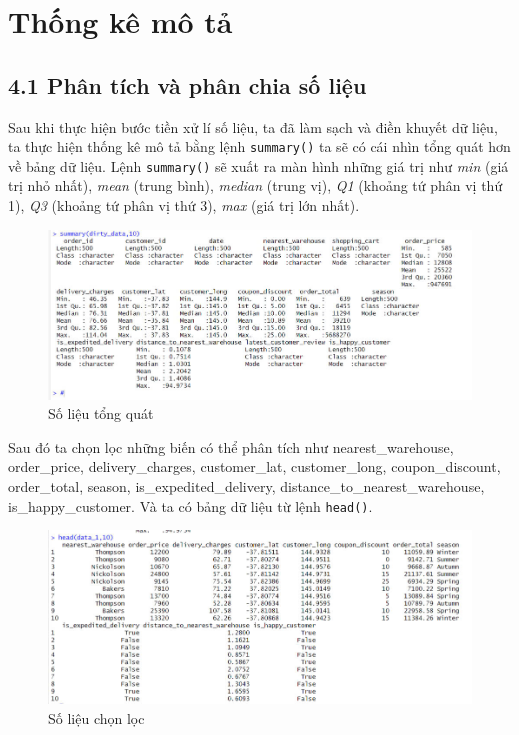 \section{Thống kê mô tả}
\subsection*{4.1 Phân tích và phân chia số liệu}
Sau khi thực hiện bước tiền xử lí số liệu, ta đã làm sạch và điền khuyết dữ liệu, ta thực hiện thống kê mô tả bằng lệnh \texttt{summary()} ta sẽ có cái nhìn tổng quát hơn về bảng dữ liệu. Lệnh \texttt{summary()} sẽ xuất ra màn hình những giá trị như \textit{min} (giá trị nhỏ nhất), \textit{mean} (trung bình), \textit{median} (trung vị), \textit{Q1} (khoảng tứ phân vị thứ 1), \textit{Q3} (khoảng tứ phân vị thứ 3), \textit{max} (giá trị lớn nhất).
\begin{figure}[H]
    \centering
    \includegraphics[width=0.9\linewidth]{graphics/bang1.jpg}
    \caption{Số liệu tổng quát}
    
\end{figure}
Sau đó ta chọn lọc những biến có thể phân tích như nearest\_warehouse, order\_price, delivery\_charges, customer\_lat, customer\_long, coupon\_discount, order\_total, season, is\_expedited\_delivery, distance\_to\_nearest\_warehouse, is\_happy\_customer. Và ta có bảng dữ liệu từ lệnh \texttt{head()}.
\begin{figure}[H]
    \centering
    \includegraphics[width=0.9\linewidth]{graphics/bang2.jpg}
    \caption{Số liệu chọn lọc}
   
\end{figure}
            
